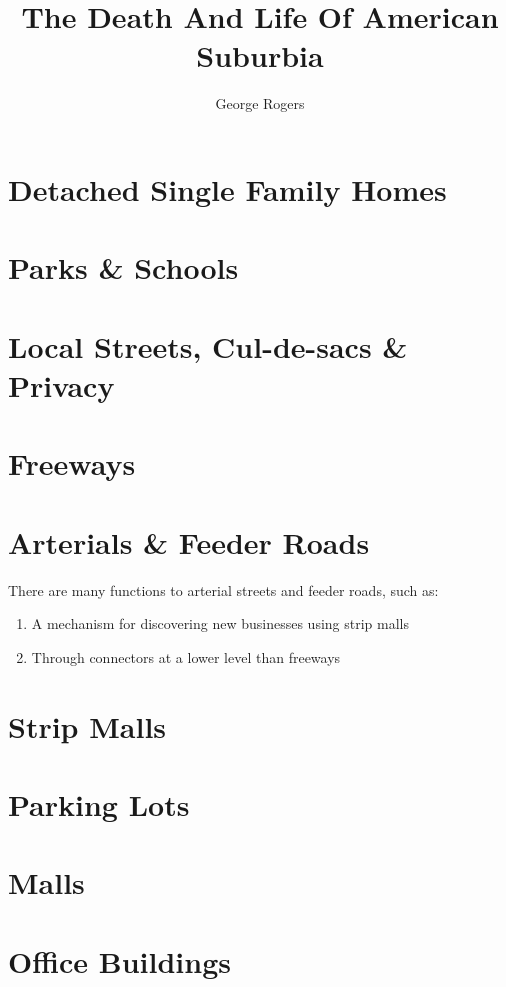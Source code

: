 \documentclass[letterpaper]{report}
\title{The Death And Life Of American Suburbia}
\author{George Rogers}
\begin{document}
\maketitle
\tableofcontents
\chapter{Detached Single Family Homes}
\chapter{Parks \& Schools}
\chapter{Local Streets, Cul-de-sacs \& Privacy}
\chapter{Freeways}
\chapter{Arterials \& Feeder Roads}
There are many functions to arterial streets and feeder roads, such as:
\begin{enumerate}
    \item A mechanism for discovering new businesses using strip malls
    \item Through connectors at a lower level than freeways
\end{enumerate}
\chapter{Strip Malls}
\chapter{Parking Lots}
\chapter{Malls}
\chapter{Office Buildings}
\end{document}
